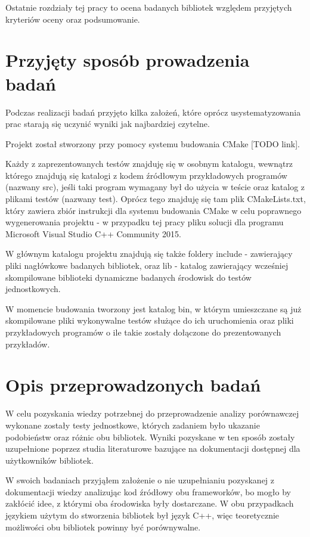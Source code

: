 \documentclass[12pt,a4paper,notitlepage]{report}
\begin{document}
Ostatnie rozdziały tej pracy to ocena badanych bibliotek względem przyjętych kryteriów oceny oraz podsumowanie.

\chapter{Przyjęty sposób prowadzenia badań}

Podczas realizacji badań przyjęto kilka założeń, które oprócz usystematyzowania prac starają się uczynić wyniki jak najbardziej czytelne.

Projekt został stworzony przy pomocy systemu budowania CMake [TODO link].

Każdy z zaprezentowanych testów znajduję się w osobnym katalogu, wewnątrz którego znajdują się katalogi z kodem źródłowym przykładowych programów (nazwany src), jeśli taki program wymagany był do użycia w teście oraz katalog z plikami testów (nazwany test). Oprócz tego znajduję się tam plik CMakeLists.txt, który zawiera zbiór instrukcji dla systemu budowania CMake w celu poprawnego wygenerowania projektu - w przypadku tej pracy pliku solucji dla programu Microsoft Visual Studio C++ Community 2015.

W głównym katalogu projektu znajdują się także foldery include - zawierający pliki nagłówkowe badanych bibliotek, oraz lib - katalog zawierający wcześniej skompilowane biblioteki dynamiczne badanych środowisk do testów jednostkowych.

W momencie budowania tworzony jest katalog bin, w którym umieszczane są już skompilowane pliki wykonywalne testów służące do ich uruchomienia oraz pliki przykładowych programów o ile takie zostały dołączone do prezentowanych przykładów.


\chapter{Opis przeprowadzonych badań}

W celu pozyskania wiedzy potrzebnej do przeprowadzenie analizy porównawczej wykonane zostały testy jednostkowe, których zadaniem było ukazanie podobieństw oraz różnic obu bibliotek. Wyniki pozyskane w ten sposób zostały uzupełnione poprzez studia literaturowe bazujące na dokumentacji dostępnej dla użytkowników bibliotek.

W swoich badaniach przyjąłem założenie o nie uzupełnianiu pozyskanej z dokumentacji wiedzy analizując kod źródłowy obu frameworków, bo mogło by zakłócić idee, z którymi oba środowiska były dostarczane. W obu przypadkach językiem użytym do stworzenia bibliotek był język C++, więc teoretycznie możliwości obu bibliotek powinny być porównywalne.
\end{document}
